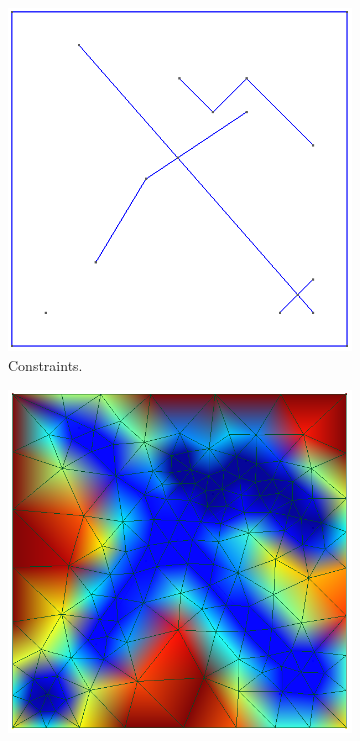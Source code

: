 \begin{figure}[ht]
    \centering
    \begin{subfigure}[b]{0.32\textwidth}
        \centering
        \includegraphics[width=\textwidth]{report/Images/Combining software/Mesh refinement/mesh_refinement_constraints.png}
        \caption{Constraints.}
        \label{fig:fig:mesh-refinement-constraints}
    \end{subfigure}
    \begin{subfigure}[b]{0.32\textwidth}
        \centering
        \includegraphics[width=\textwidth]{report/Images/Combining software/Mesh refinement/mesh_refinement_field.png}

\end{subfigure}
\end{figure}
